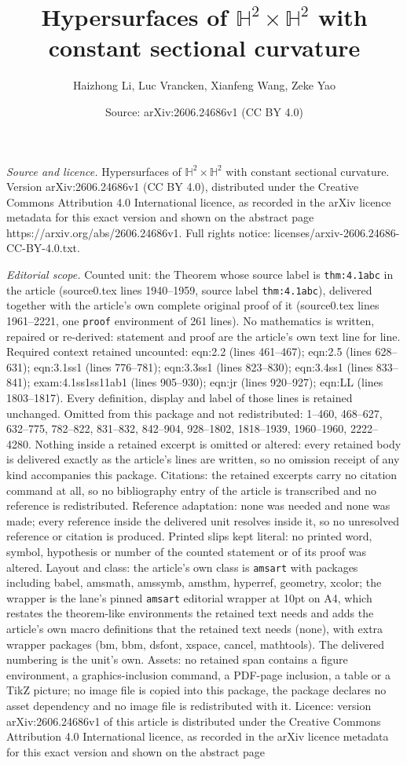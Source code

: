 \documentclass[10pt,a4paper]{amsart}
\title[Hypersurfaces of $\mathbb{H}^2\times\mathbb{H}^2$ with const]{Hypersurfaces of $\mathbb{H}^2\times\mathbb{H}^2$ with constant sectional curvature}
\author{Haizhong Li, Luc Vrancken, Xianfeng Wang, Zeke Yao}
\date{Source: arXiv:2606.24686v1 (CC BY 4.0)}
\begin{document}
\maketitle

\noindent\emph{Source and licence.} Hypersurfaces of $\mathbb{H}^2\times\mathbb{H}^2$ with constant sectional curvature. Version arXiv:2606.24686v1 (CC BY 4.0), distributed under the Creative Commons Attribution 4.0 International licence, as recorded in the arXiv licence metadata for this exact version and shown on the abstract page https://arxiv.org/abs/2606.24686v1. Full rights notice: licenses/arxiv-2606.24686-CC-BY-4.0.txt.\par\smallskip

\noindent\textit{Editorial scope.} Counted unit: the Theorem whose source label is \texttt{thm:4.1abc} in the article (source0.tex lines 1940--1959, source label \texttt{thm:4.1abc}), delivered together with the article's own complete original proof of it (source0.tex lines 1961--2221, one \texttt{proof} environment of 261 lines). No mathematics is written, repaired or re-derived: statement and proof are the article's own text line for line. Required context retained uncounted: eqn:2.2 (lines 461--467); eqn:2.5 (lines 628--631); eqn:3.1ss1 (lines 776--781); eqn:3.3ss1 (lines 823--830); eqn:3.4ss1 (lines 833--841); exam:4.1ss1ss11ab1 (lines 905--930); eqn:jr (lines 920--927); eqn:LL (lines 1803--1817). Every definition, display and label of those lines is retained unchanged. Omitted from this package and not redistributed: 1--460, 468--627, 632--775, 782--822, 831--832, 842--904, 928--1802, 1818--1939, 1960--1960, 2222--4280. Nothing inside a retained excerpt is omitted or altered: every retained body is delivered exactly as the article's lines are written, so no omission receipt of any kind accompanies this package. Citations: the retained excerpts carry no citation command at all, so no bibliography entry of the article is transcribed and no reference is redistributed. Reference adaptation: none was needed and none was made; every reference inside the delivered unit resolves inside it, so no unresolved reference or citation is produced. Printed slips kept literal: no printed word, symbol, hypothesis or number of the counted statement or of its proof was altered. Layout and class: the article's own class is \texttt{amsart} with packages including babel, amsmath, amssymb, amsthm, hyperref, geometry, xcolor; the wrapper is the lane's pinned \texttt{amsart} editorial wrapper at 10pt on A4, which restates the theorem-like environments the retained text needs and adds the article's own macro definitions that the retained text needs (none), with extra wrapper packages (bm, bbm, dsfont, xspace, cancel, mathtools). The delivered numbering is the unit's own. Assets: no retained span contains a figure environment, a graphics-inclusion command, a PDF-page inclusion, a table or a TikZ picture; no image file is copied into this package, the package declares no asset dependency and no image file is redistributed with it. Licence: version arXiv:2606.24686v1 of this article is distributed under the Creative Commons Attribution 4.0 International licence, as recorded in the arXiv licence metadata for this exact version and shown on the abstract page 
\end{document}
